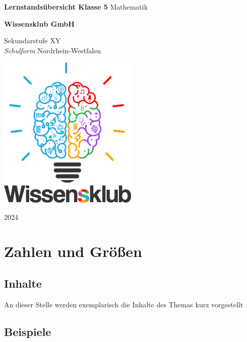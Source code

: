 \documentclass{article}
\begin{document}
\begin{titlepage}
    \begin{center}
        \vspace*{1cm}
            
        \Huge
        \textbf{Lernstandsübersicht Klasse 5}            
        \vspace{0.5cm}
        \LARGE
        Mathematik
            
        \vspace{1.5cm}
            
        \textbf{Wissensklub GmbH}
            
        \vfill
            
        Sekundarstufe XY\\
        \textit{Schulform} Nordrhein-Westfalen
            
        \vspace{0.8cm}
            
        \includegraphics[width=0.5\textwidth]{Wissensklub-Logo.png}
            
        \Large
        2024          
    \end{center}
\end{titlepage}
\section{Zahlen und Größen}
\subsection{Inhalte}
An dieser Stelle werden exemplarisch die Inhalte des Themas kurz vorgestellt
\subsection{Beispiele}
\end{document}

